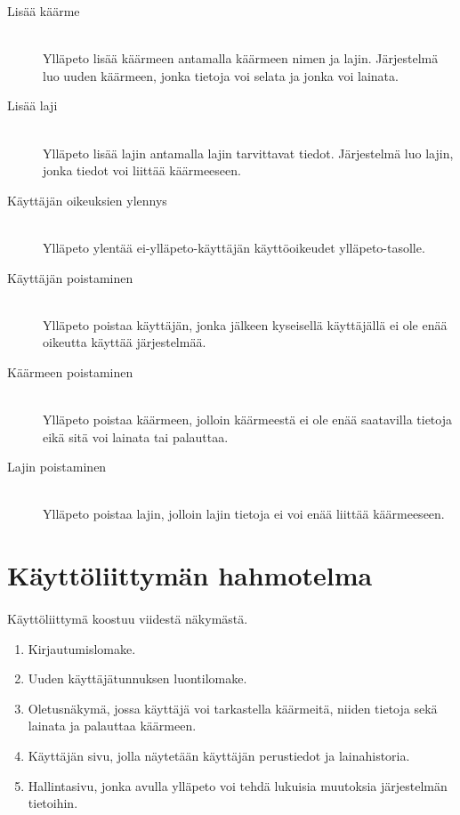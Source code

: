 \documentclass[11pt]{article}
\begin{document}
\begin{description}
\item[Lisää käärme] \hfill \\
Ylläpeto lisää käärmeen antamalla käärmeen nimen ja lajin. Järjestelmä luo uuden käärmeen, jonka tietoja voi selata ja jonka voi lainata.
\item[Lisää laji] \hfill \\
Ylläpeto lisää lajin antamalla lajin tarvittavat tiedot. Järjestelmä luo lajin, jonka tiedot voi liittää käärmeeseen.
\item[Käyttäjän oikeuksien ylennys] \hfill \\
Ylläpeto ylentää ei-ylläpeto-käyttäjän käyttöoikeudet ylläpeto-tasolle.
\item[Käyttäjän poistaminen] \hfill \\
Ylläpeto poistaa käyttäjän, jonka jälkeen kyseisellä käyttäjällä ei ole enää oikeutta käyttää järjestelmää.
\item[Käärmeen poistaminen] \hfill \\
Ylläpeto poistaa käärmeen, jolloin käärmeestä ei ole enää saatavilla tietoja eikä sitä voi lainata tai palauttaa.
\item[Lajin poistaminen] \hfill \\
Ylläpeto poistaa lajin, jolloin lajin tietoja ei voi enää liittää käärmeeseen.
\end{description}

\section{Käyttöliittymän hahmotelma}

\paragraph{} Käyttöliittymä koostuu viidestä näkymästä.

\begin{enumerate}
\item Kirjautumislomake.
\item Uuden käyttäjätunnuksen luontilomake.
\item Oletusnäkymä, jossa käyttäjä voi tarkastella käärmeitä, niiden tietoja sekä lainata ja palauttaa käärmeen.
\item Käyttäjän sivu, jolla näytetään käyttäjän perustiedot ja lainahistoria.
\item Hallintasivu, jonka avulla ylläpeto voi tehdä lukuisia muutoksia järjestelmän tietoihin.
\end{enumerate}
\end{document}
